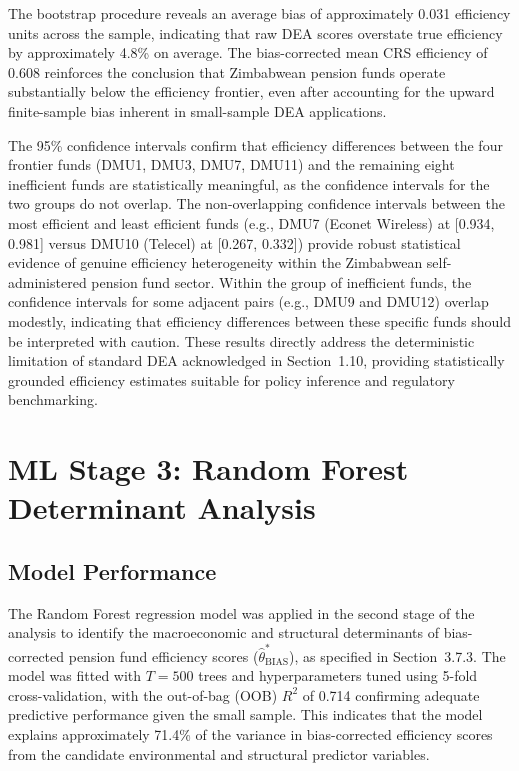 \documentclass[12pt,a4paper]{article}
\begin{document}
The bootstrap procedure reveals an average bias of approximately 0.031 efficiency units across the sample, indicating that raw DEA scores overstate true efficiency by approximately 4.8\% on average. The bias-corrected mean CRS efficiency of 0.608 reinforces the conclusion that Zimbabwean pension funds operate substantially below the efficiency frontier, even after accounting for the upward finite-sample bias inherent in small-sample DEA applications.

The 95\% confidence intervals confirm that efficiency differences between the four frontier funds (DMU1, DMU3, DMU7, DMU11) and the remaining eight inefficient funds are statistically meaningful, as the confidence intervals for the two groups do not overlap. The non-overlapping confidence intervals between the most efficient and least efficient funds (e.g., DMU7 (Econet Wireless) at [0.934, 0.981] versus DMU10 (Telecel) at [0.267, 0.332]) provide robust statistical evidence of genuine efficiency heterogeneity within the Zimbabwean self-administered pension fund sector. Within the group of inefficient funds, the confidence intervals for some adjacent pairs (e.g., DMU9 and DMU12) overlap modestly, indicating that efficiency differences between these specific funds should be interpreted with caution. These results directly address the deterministic limitation of standard DEA acknowledged in Section~1.10, providing statistically grounded efficiency estimates suitable for policy inference and regulatory benchmarking.

\section{ML Stage 3: Random Forest Determinant Analysis}

\subsection{Model Performance}

The Random Forest regression model was applied in the second stage of the analysis to identify the macroeconomic and structural determinants of bias-corrected pension fund efficiency scores ($\hat{\theta}^*_{\text{BIAS}}$), as specified in Section~3.7.3. The model was fitted with $T = 500$ trees and hyperparameters tuned using 5-fold cross-validation, with the out-of-bag (OOB) $R^2$ of 0.714 confirming adequate predictive performance given the small sample. This indicates that the model explains approximately 71.4\% of the variance in bias-corrected efficiency scores from the candidate environmental and structural predictor variables.
\end{document}
